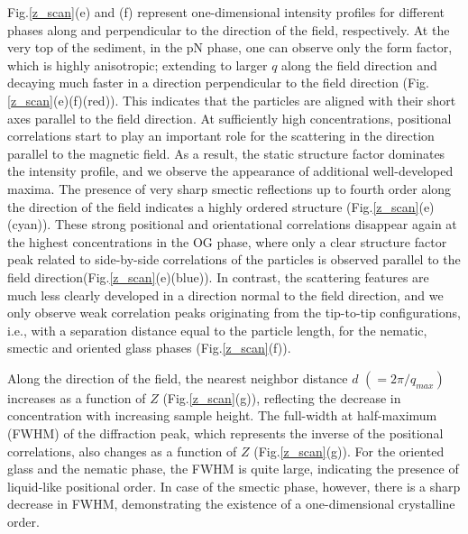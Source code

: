\documentclass[aps,prl,preprint,superscriptaddress]{revtex4-1} %
\begin{document}
Fig.\ref{z_scan}(e) and (f) represent one-dimensional intensity profiles for different phases along and perpendicular to the direction of the field, respectively. At the very top of the sediment, in the pN phase, one can observe only the form factor, which is highly anisotropic; extending to larger $q$ along the field direction and decaying much faster in a direction perpendicular to the field direction (Fig.\ref{z_scan}(e)(f)(red)). This indicates that the particles are aligned with their short axes parallel to the field direction. At sufficiently high concentrations, positional correlations start to play an important role for the scattering in the direction parallel to the magnetic field. As a result, the static structure factor dominates the intensity profile, and we observe the appearance of additional well-developed maxima. The presence of very sharp smectic reflections up to fourth order along the direction of the field indicates a highly ordered structure (Fig.\ref{z_scan}(e)(cyan)). These strong positional and orientational correlations disappear again at the highest concentrations in the OG phase, where only a clear structure factor peak related to side-by-side correlations of the particles is observed parallel to the field direction(Fig.\ref{z_scan}(e)(blue)). In contrast, the scattering features are much less clearly developed in a direction normal to the field direction, and we only observe weak correlation peaks originating from the tip-to-tip configurations, i.e., with a separation distance equal to the particle length, for the nematic, smectic and oriented glass phases (Fig.\ref{z_scan}(f)). \par
Along the direction of the field, the nearest neighbor distance $d$ $(=2\pi/q_{max})$ increases as a function of $Z$ (Fig.\ref{z_scan}(g)), reflecting the decrease in concentration with increasing sample height. The full-width at half-maximum (FWHM) of the diffraction peak, which represents the inverse of the positional correlations, also changes as a function of $Z$ (Fig.\ref{z_scan}(g)). For the oriented glass and the nematic phase, the FWHM is quite large, indicating the presence of liquid-like positional order. In case of the smectic phase, however, there is a sharp decrease in FWHM, demonstrating the existence of a one-dimensional crystalline order.\par   %
\end{document}
